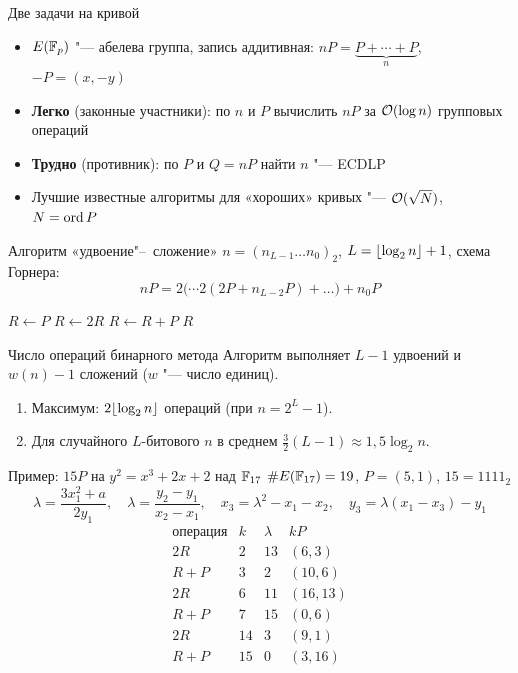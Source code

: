 \documentclass{ca-slides}
\author{}
\begin{document}
\titleframe

\begin{canvasframe}{Две задачи на кривой}
  \begin{itemize}
    \item $E(\mathbb{F}_p)$ "--- абелева группа, запись аддитивная:
      $nP = \underbrace{P + \cdots + P}_{n}$, \quad $-P = (x, -y)$
    \item \textbf{Легко} (законные участники): по $n$ и $P$ вычислить $nP$ за $\mathcal{O}(\log n)$
      групповых операций
    \item \textbf{Трудно} (противник): по $P$ и $Q = nP$ найти $n$ "--- ECDLP
    \item Лучшие известные алгоритмы для «хороших» кривых "--- $\mathcal{O}(\sqrt N)$, $N = \operatorname{ord} P$
  \end{itemize}
\end{canvasframe}

\begin{canvasframe}{Алгоритм «удвоение"--~сложение»}
  $n = (n_{L-1} \dots n_0)_2$, \quad $L = \lfloor\log_2 n\rfloor + 1$, \quad схема Горнера:
  \[nP = 2\bigl(\cdots 2(2P + n_{L-2}P) + \dots\bigr) + n_0 P\]
  \begin{algorithmic}[1]
    \State $R \gets P$
      \State $R \gets 2R$
       \State $R \gets R + P$ \EndIf
    \EndFor
    \State \Return $R$
  \end{algorithmic}
\end{canvasframe}

\begin{theoremframe}{Число операций бинарного метода}
  Алгоритм выполняет $L - 1$ удвоений и $w(n) - 1$ сложений ($w$ "--- число единиц).
  \begin{enumerate}
    \item Максимум: $2\lfloor\log_2 n\rfloor$ операций (при $n = 2^L - 1$).
    \item Для случайного $L$-битового $n$ в среднем $\frac32 (L - 1) \approx 1{,}5 \log_2 n$.
  \end{enumerate}
\end{theoremframe}

\begin{canvasframe}{Пример: $15P$ на $y^2 = x^3 + 2x + 2$ над $\mathbb{F}_{17}$}
  \small
  $\#E(\mathbb{F}_{17}) = 19$, \quad $P = (5, 1)$, \quad $15 = 1111_2$
  \[
  \lambda = \frac{3x_1^2 + a}{2y_1}, \quad \lambda = \frac{y_2 - y_1}{x_2 - x_1}, \quad
  x_3 = \lambda^2 - x_1 - x_2, \quad y_3 = \lambda(x_1 - x_3) - y_1
  \]
  \[
  \begin{array}{l|r|r|c}
    \text{операция} & k & \lambda & kP \\ \hline
    2R    & 2  & 13 & (6, 3)   \\
    R + P & 3  & 2  & (10, 6)  \\
    2R    & 6  & 11 & (16, 13) \\
    R + P & 7  & 15 & (0, 6)   \\
    2R    & 14 & 3  & (9, 1)   \\
    R + P & 15 & 0  & (3, 16)
  \end{array}
  \]
\end{canvasframe}
\end{document}

